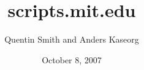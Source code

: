 \documentclass[landscape]{slides}
\title{scripts.mit.edu}
\author{Quentin Smith and Anders Kaseorg}
\date{October 8, 2007}
\begin{document}
\begin{slide}
    \thispagestyle{empty}
    \maketitle
\end{slide}


\end{document}
